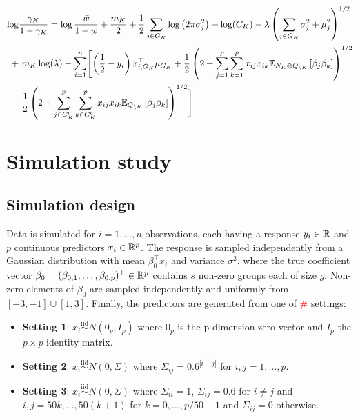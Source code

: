 \documentclass[12pt]{article}
\renewcommand{\red}[1]{\textcolor{red}{#1}}
\begin{document}
\begin{equation}
\begin{aligned}
    \log & \frac{\gamma_K}{1 - \gamma_K}
=
    \log \frac{\bar{w}}{1 - \bar{w}}
+
    \frac{m_K}{2}
+
    \frac{1}{2} \sum_{j \in G_K} \log \left( 2 \pi \sigma_j^2 \right)
+
    \log(C_K)
-
    \lambda \left( \sum_{j \in G_K} 
	\sigma_j^2 + \mu_j^2
    \right)^{1/2} \\
+ &\
    m_K \log (\lambda)
-
    \sum_{i=1}^n \Biggl[
	\left( \frac{1}{2} - y_i \right) x_{i, G_K}^\top \mu_{G_K}
	+
	\frac{1}{2} \left( 2 + \sum_{j=1}^p \sum_{k=1}^p x_{ij} x_{ik} 
	\mathbb{E}_{N_K \otimes Q_{\backslash K}} \left[ \beta_j \beta_k \right] \right)^{1/2} \\
	- &\
	\frac{1}{2} \left( 2 + \sum_{j \in G_K^c}^p \sum_{k \in G_K^c}^p x_{ij} x_{ik} 
	\mathbb{E}_{Q_{\backslash K}} \left[ \beta_j \beta_k \right] \right)^{1/2} 
    \Biggr]
\end{aligned}
\end{equation}



\newpage
\section{Simulation study}

\subsection{Simulation design}

Data is simulated for $i=1,\dots,n$ observations, each having a response $y_i \in \mathbb{R}$ and $p$ continuous predictors $x_i \in \mathbb{R}^p$. The response is sampled independently from a Gaussian distribution with mean $\beta_0^\top x_i$ and variance $\sigma^2$, where the true coefficient vector $\beta_0 = (\beta_{0, 1}, \dots, \beta_{0, p})^\top \in \mathbb{R}^p$ contains $s$ non-zero groups each of size $g$. Non-zero elements of $\beta_{0}$ are sampled independently and uniformly from $[-3,-1] \cup [1,3]$. Finally, the predictors are generated from one of \red{\#} settings:
\begin{itemize}
    \item \textbf{Setting 1}: $x_i \overset{\text{iid}}{\sim} N(0_p, I_p)$ where $0_p$ is the p-dimension zero vector and $I_p$ the $p\times p$ identity matrix.
    \item \textbf{Setting 2}: $x_i \overset{\text{iid}}{\sim} N(0, \Sigma)$ where $\Sigma_{ij} = 0.6^{|i - j|}$ for $i,j=1,\dots,p$.
    \item \textbf{Setting 3}: $x_i \overset{\text{iid}}{\sim} N(0, \Sigma)$  where $\Sigma_{ii} = 1$, $\Sigma_{ij}=0.6$ for $i\neq j$ and $i, j = 50k, \dots, 50(k+1)$ for $k=0,\dots, p/50 -1$ and $\Sigma_{ij} =0$ otherwise.
\end{itemize}
\end{document}
